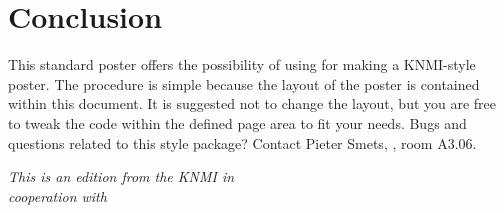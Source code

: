 \documentclass{article}
\begin{document}

\section*{Conclusion}
This standard poster offers the possibility of using \latex for making a KNMI-style poster. The procedure is simple because the layout of the poster is contained within this document. It is suggested not to change the layout, but you are free to tweak the \latex code within the defined page area to fit your needs. Bugs and questions related to this \latex style package? Contact Pieter Smets, , room A3.06.

\pushdown

\begin{fminipage}{\columnwidth}
\textit{%
\noindent This is an edition from the KNMI in \\
cooperation with
} %
\end{fminipage}

\ecols %
\end{document}
